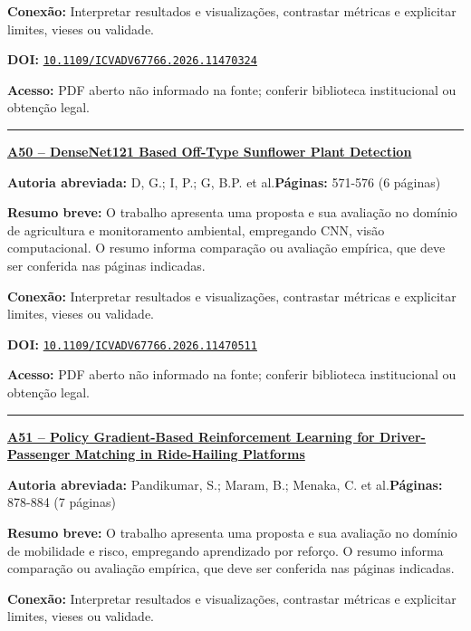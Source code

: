 \documentclass[10pt,a4paper]{article}
\begin{document}
\textbf{Conexão:} Interpretar resultados e visualizações, contrastar métricas e explicitar limites, vieses ou validade.\par
\textbf{DOI:} \href{https://doi.org/10.1109/ICVADV67766.2026.11470324}{\nolinkurl{10.1109/ICVADV67766.2026.11470324}}\par
\textbf{Acesso:} PDF aberto não informado na fonte; conferir biblioteca institucional ou obtenção legal.\par
\noindent\rule{\textwidth}{0.35pt}
\par\medskip\noindent
{\large\bfseries\href{https://doi.org/10.1109/ICVADV67766.2026.11470511}{A50 -- DenseNet121 Based Off-Type Sunflower Plant Detection}}\par\smallskip
\textbf{Autoria abreviada:} D, G.; I, P.; G, B.P. et al.\quad \textbf{Páginas:} 571-576 (6 páginas)\par
\textbf{Resumo breve:} O trabalho apresenta uma proposta e sua avaliação no domínio de agricultura e monitoramento ambiental, empregando CNN, visão computacional. O resumo informa comparação ou avaliação empírica, que deve ser conferida nas páginas indicadas.\par
\textbf{Conexão:} Interpretar resultados e visualizações, contrastar métricas e explicitar limites, vieses ou validade.\par
\textbf{DOI:} \href{https://doi.org/10.1109/ICVADV67766.2026.11470511}{\nolinkurl{10.1109/ICVADV67766.2026.11470511}}\par
\textbf{Acesso:} PDF aberto não informado na fonte; conferir biblioteca institucional ou obtenção legal.\par
\noindent\rule{\textwidth}{0.35pt}
\par\medskip\noindent
{\large\bfseries\href{https://doi.org/10.1109/ICVADV67766.2026.11470467}{A51 -- Policy Gradient-Based Reinforcement Learning for Driver-Passenger Matching in Ride-Hailing Platforms}}\par\smallskip
\textbf{Autoria abreviada:} Pandikumar, S.; Maram, B.; Menaka, C. et al.\quad \textbf{Páginas:} 878-884 (7 páginas)\par
\textbf{Resumo breve:} O trabalho apresenta uma proposta e sua avaliação no domínio de mobilidade e risco, empregando aprendizado por reforço. O resumo informa comparação ou avaliação empírica, que deve ser conferida nas páginas indicadas.\par
\textbf{Conexão:} Interpretar resultados e visualizações, contrastar métricas e explicitar limites, vieses ou validade.\par
\end{document}
